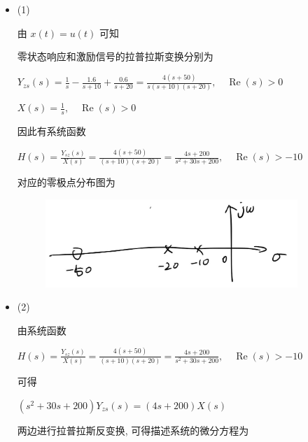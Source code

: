 \documentclass[a4paper,UTF8]{article}
\numberwithin{equation}{section}
\begin{document}
  \begin{framed}
    \begin{spacing}{1.5}
      \begin{itemize}

        \item (1)

        由 $x(t) = u(t)$ 可知
        
        零状态响应和激励信号的拉普拉斯变换分别为
        
        $\displaystyle Y_{zs}(s) = \frac{1}{s} - \frac{1.6}{s+10} + \frac{0.6}{s+20} = \frac{4 (s + 50)}{s (s + 10) (s + 20)}, \quad \operatorname{Re}(s) > 0$
        
        $\displaystyle X(s) = \frac{1}{s}, \quad \operatorname{Re}(s) > 0$
        
        因此有系统函数
        
        $\displaystyle H(s) = \frac{Y_{sz}(s)}{X(s)} = \frac{4 (s + 50)}{(s + 10) (s + 20)} = \frac{4 s + 200}{s^{2} + 30 s + 200}, \quad \operatorname{Re}(s) > -10$
        
        对应的零极点分布图为
        
        \begin{figure}[H]
          \centering
          \includegraphics[width=0.9\textwidth]{images/2022-12-12-12-52-26.png}
          \label{Fig.main1}
        \end{figure}
        
        \item (2)
        
        由系统函数
        
        $\displaystyle H(s) = \frac{Y_{sz}(s)}{X(s)} = \frac{4 (s + 50)}{(s + 10) (s + 20)} = \frac{4 s + 200}{s^{2} + 30 s + 200}, \quad \operatorname{Re}(s) > -10$
        
        可得
        
        $\displaystyle (s^{2} + 30 s + 200)Y_{zs}(s) = (4s + 200)X(s)$
        
        两边进行拉普拉斯反变换, 可得描述系统的微分方程为
        

\end{itemize}
\end{spacing}
\end{framed}
\end{document}
